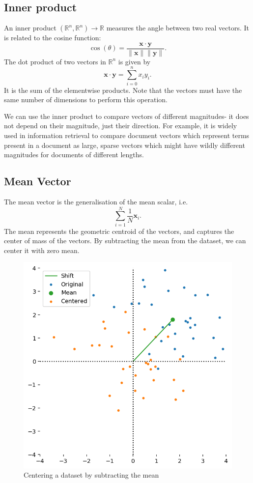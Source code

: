\documentclass[a4paper, openany]{memoir}
\begin{document}
    \subsection{Inner product}
    An inner product $(\mathbb{R}^n, \mathbb{R}^n) \to \mathbb{R}$ measures the angle between two real vectors. It is related to the cosine function:
    \[\cos (\theta) = \frac{\mathbf{x} \cdot \mathbf{y}}{\lVert \mathbf{x} \rVert \lVert \mathbf{y} \rVert}.\]
    The dot product of two vectors in $\mathbb{R}^n$ is given by
    \[\mathbf{x} \cdot \mathbf{y} = \sum_{i=0}^n x_i y_i.\]
    It is the sum of the elementwise products. Note that the vectors must have the same number of dimensions to perform this operation.

    We can use the inner product to compare vectors of different magnitudes- it does not depend on their magnitude, just their direction. For example, it is widely used in information retrieval to compare document vectors which represent terms present in a document as large, sparse vectors which might have wildly different magnitudes for documents of different lengths.

    \subsection{Mean Vector}
    The mean vector is the generalisation of the mean scalar, i.e.
    \[\sum_{i=1}^N \frac{1}{N} \mathbf{x}_i.\]
    The mean represents the geometric centroid of the vectors, and captures the center of mass of the vectors. By subtracting the mean from the dataset, we can center it with zero mean.
    \begin{figure}[H]
        \centering
        \includegraphics[scale=0.55]{src/3.4 Centered Data.png}
        \caption{Centering a dataset by subtracting the mean}
    \end{figure}
\end{document}
